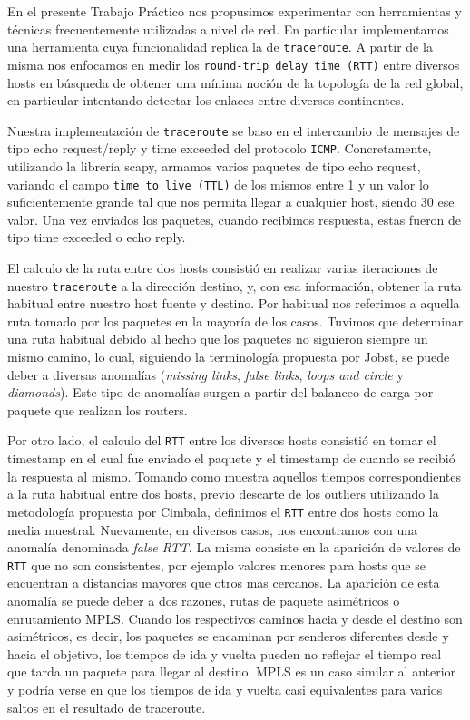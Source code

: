 En el presente Trabajo Práctico nos propusimos experimentar con herramientas y técnicas frecuentemente utilizadas a nivel de red. En particular implementamos una herramienta cuya funcionalidad replica la de \texttt{traceroute}. A partir de la misma nos enfocamos en medir los \texttt{round-trip delay time (RTT)} entre diversos hosts en búsqueda de obtener una mínima noción de la topología de la red global, en particular intentando detectar los enlaces entre diversos continentes.

Nuestra implementación de \texttt{traceroute} se baso en el intercambio de mensajes de tipo echo request/reply y time exceeded del protocolo \texttt{ICMP}. Concretamente, utilizando la librería scapy, armamos varios paquetes de tipo echo request, variando el campo \texttt{time to live (TTL)} de los mismos entre 1 y un valor lo suficientemente grande tal que nos permita llegar a cualquier host, siendo 30 ese valor. Una vez enviados los paquetes, cuando recibimos respuesta, estas fueron de tipo time exceeded o echo reply.

El calculo de la ruta entre dos hosts consistió en realizar varias iteraciones de nuestro \texttt{traceroute} a la dirección destino, y, con esa información, obtener la ruta habitual entre nuestro host fuente y destino. Por habitual nos referimos a aquella ruta tomado por los paquetes en la mayoría de los casos. Tuvimos que determinar una ruta habitual debido al hecho que los paquetes no siguieron siempre un mismo camino, lo cual, siguiendo la terminología propuesta por Jobst, se puede deber a diversas anomalías (\textit{missing links}, \textit{false links}, \textit{loops and circle} y \textit{diamonds}). Este tipo de anomalías surgen a partir del balanceo de carga por paquete que realizan los routers.

Por otro lado, el calculo del \texttt{RTT} entre los diversos hosts consistió en tomar el timestamp en el cual fue enviado el paquete y el timestamp de cuando se recibió la respuesta al mismo. Tomando como muestra aquellos tiempos correspondientes a la ruta habitual entre dos hosts, previo descarte de los outliers utilizando la metodología propuesta por Cimbala, definimos el \texttt{RTT} entre dos hosts como la media muestral. Nuevamente, en diversos casos, nos encontramos con una anomalía denominada \textit{false RTT}. La misma consiste en la aparición de valores de \texttt{RTT} que no son consistentes, por ejemplo valores menores para hosts que se encuentran a distancias mayores que otros mas cercanos. La aparición de esta anomalía se puede deber a dos razones, rutas de paquete asimétricos o enrutamiento MPLS. Cuando los respectivos caminos hacia y desde el destino son asimétricos, es decir, los paquetes se encaminan por senderos diferentes desde y hacia el objetivo, los tiempos de ida y vuelta pueden no reflejar el tiempo real que tarda un paquete para llegar al destino. MPLS es un caso similar al anterior y podría verse en que los tiempos de ida y vuelta casi equivalentes para varios saltos en el resultado de traceroute.

